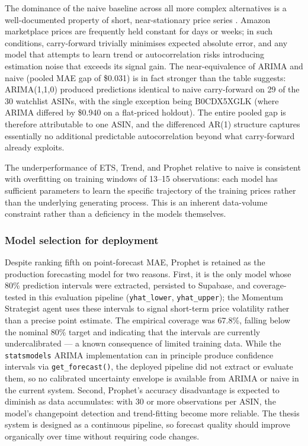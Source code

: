 The dominance of the naive baseline across all more complex alternatives is a well-documented property of short, near-stationary price series \citep{makridakis2018m4}. Amazon marketplace prices are frequently held constant for days or weeks; in such conditions, carry-forward trivially minimises expected absolute error, and any model that attempts to learn trend or autocorrelation risks introducing estimation noise that exceeds its signal gain. The near-equivalence of ARIMA and naive (pooled MAE gap of \$0.031) is in fact stronger than the table suggests: ARIMA(1,1,0) produced predictions identical to naive carry-forward on 29 of the 30 watchlist ASINs, with the single exception being B0CDX5XGLK (where ARIMA differed by \$0.940 on a flat-priced holdout). The entire pooled gap is therefore attributable to one ASIN, and the differenced AR(1) structure captures essentially no additional predictable autocorrelation beyond what carry-forward already exploits.

The underperformance of ETS, Trend, and Prophet relative to naive is consistent with overfitting on training windows of 13--15 observations: each model has sufficient parameters to learn the specific trajectory of the training prices rather than the underlying generating process. This is an inherent data-volume constraint rather than a deficiency in the models themselves.

\subsubsection*{Model selection for deployment}

Despite ranking fifth on point-forecast MAE, Prophet is retained as the production forecasting model for two reasons. First, it is the only model whose 80\% prediction intervals were extracted, persisted to Supabase, and coverage-tested in this evaluation pipeline (\texttt{yhat\_lower}, \texttt{yhat\_upper}); the Momentum Strategist agent uses these intervals to signal short-term price volatility rather than a precise point estimate. The empirical coverage was 67.8\%, falling below the nominal 80\% target and indicating that the intervals are currently undercalibrated --- a known consequence of limited training data. While the \texttt{statsmodels} ARIMA implementation can in principle produce confidence intervals via \texttt{get\_forecast()}, the deployed pipeline did not extract or evaluate them, so no calibrated uncertainty envelope is available from ARIMA or naive in the current system. Second, Prophet's accuracy disadvantage is expected to diminish as data accumulates: with 30 or more observations per ASIN, the model's changepoint detection and trend-fitting become more reliable. The thesis system is designed as a continuous pipeline, so forecast quality should improve organically over time without requiring code changes.

